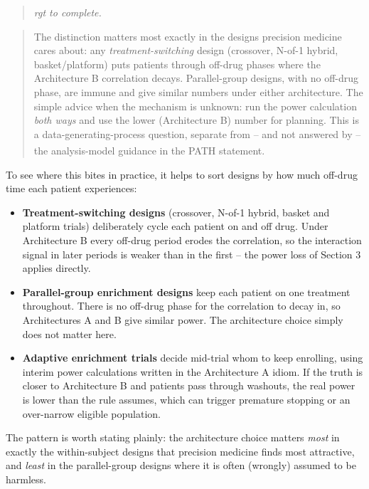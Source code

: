 \documentclass[
  11pt,
]{article}
\newenvironment{rgt}{%
  \begin{quote}\small\itshape\color[RGB]{20,60,160}}{%
  \end{quote}}
\newenvironment{orig}{%
  \begin{quote}\normalsize\color[gray]{0.55}}{%
  \end{quote}}
\begin{document}
\begin{rgt}
rgt to complete.

\end{rgt}

\begin{orig}
The distinction matters most exactly in the designs precision medicine
cares about: any \emph{treatment-switching} design (crossover, N-of-1
hybrid, basket/platform) puts patients through off-drug phases where the
Architecture B correlation decays. Parallel-group designs, with no
off-drug phase, are immune and give similar numbers under either
architecture. The simple advice when the mechanism is unknown: run the
power calculation \emph{both ways} and use the lower (Architecture B)
number for planning. This is a data-generating-process question,
separate from -- and not answered by -- the analysis-model guidance in
the PATH statement\textsuperscript{}.

\end{orig}

To see where this bites in practice, it helps to sort designs by how
much off-drug time each patient experiences:

\begin{itemize}
\item \textbf{Treatment-switching designs} (crossover, N-of-1 hybrid,
  basket and platform trials) deliberately cycle each patient on and
  off drug. Under Architecture B every off-drug period erodes the
  correlation, so the interaction signal in later periods is weaker
  than in the first -- the power loss of Section 3 applies directly.
\item \textbf{Parallel-group enrichment designs} keep each patient on
  one treatment throughout. There is no off-drug phase for the
  correlation to decay in, so Architectures A and B give similar
  power. The architecture choice simply does not matter here.
\item \textbf{Adaptive enrichment trials} decide mid-trial whom to keep
  enrolling, using interim power calculations written in the
  Architecture A idiom. If the truth is closer to Architecture B and
  patients pass through washouts, the real power is lower than the
  rule assumes, which can trigger premature stopping or an
  over-narrow eligible population.
\end{itemize}

The pattern is worth stating plainly: the architecture choice matters
\emph{most} in exactly the within-subject designs that precision
medicine finds most attractive, and \emph{least} in the parallel-group
designs where it is often (wrongly) assumed to be harmless.
\end{document}
